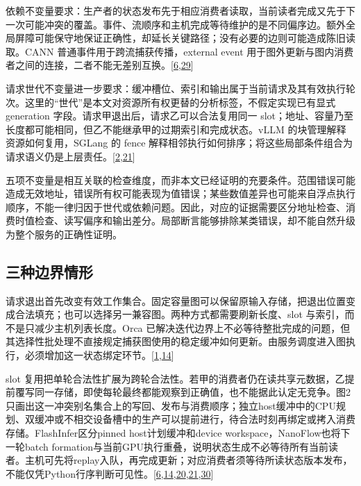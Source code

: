 \documentclass[
  UTF8,
  zihao=5]{ctexart}
\begin{document}
依赖不变量要求：生产者的状态发布先于相应消费者读取，当前读者完成又先于下一次可能冲突的覆盖。事件、流顺序和主机完成等待维护的是不同偏序边。额外全局屏障可能保守地保证正确性，却延长关键路径；没有必要的边则可能造成陈旧读取。CANN
普通事件用于跨流捕获传播，external event
用于图外更新与图内消费者之间的连接，二者不能无差别互换。{[}\protect\hyperlink{ref-cann910update}{6},\protect\hyperlink{ref-cann910multi}{29}{]}

请求世代不变量进一步要求：缓冲槽位、索引和输出属于当前请求及其有效执行轮次。这里的``世代''是本文对资源所有权更替的分析标签，不假定实现已有显式
generation 字段。请求甲退出后，请求乙可以合法复用同一
slot；地址、容量乃至长度都可能相同，但乙不能继承甲的过期索引和完成状态。vLLM
的块管理解释资源如何复用，SGLang 的 fence
解释相邻执行如何排序；将这些局部条件组合为请求语义仍是上层责任。{[}\protect\hyperlink{ref-kwon2023vllm}{2},\protect\hyperlink{ref-sglang2026impl}{21}{]}

五项不变量是相互关联的检查维度，而非本文已经证明的充要条件。范围错误可能造成无效地址，错误所有权可能表现为值错误；某些数值差异也可能来自浮点执行顺序，不能一律归因于世代或依赖问题。因此，对应的证据需要区分地址检查、消费时值检查、读写偏序和输出差分。局部断言能够排除某类错误，却不能自然升级为整个服务的正确性证明。

\hypertarget{ux4e09ux79cdux8fb9ux754cux60c5ux5f62}{%
\subsection{三种边界情形}\label{ux4e09ux79cdux8fb9ux754cux60c5ux5f62}}

请求退出首先改变有效工作集合。固定容量图可以保留原输入存储，把退出位置变成合法填充；也可以选择另一兼容图。两种方式都需要刷新长度、slot
与索引，而不是只减少主机列表长度。Orca
已解决迭代边界上不必等待整批完成的问题，但其选择性批处理不直接规定捕获图使用的稳定缓冲如何更新。由服务调度进入图执行，必须增加这一状态绑定环节。{[}\protect\hyperlink{ref-yu2022orca}{1},\protect\hyperlink{ref-ye2025flashinfer}{14}{]}

slot
复用把单轮合法性扩展为跨轮合法性。若甲的消费者仍在读共享元数据，乙提前覆写同一存储，即使每轮最终都能观察到正确值，也不能据此认定无竞争。图2只画出这一冲突别名集合上的写回、发布与消费顺序；独立host缓冲中的CPU规划、双缓冲或不相交设备槽中的生产可以提前进行，待合法时刻再绑定或拷入消费存储。FlashInfer区分pinned
host计划缓冲和device workspace，NanoFlow也将下一轮batch
formation与当前GPU执行重叠，说明状态生成不必等待所有当前读者。主机可先将replay入队，再完成更新；对应消费者须等待所读状态版本发布，不能仅凭Python行序判断可见性。{[}\protect\hyperlink{ref-cann910update}{6},\protect\hyperlink{ref-ye2025flashinfer}{14},\protect\hyperlink{ref-vllmascend2026impl}{20},\protect\hyperlink{ref-sglang2026impl}{21},\protect\hyperlink{ref-zhu2025nanoflow}{30}{]}
\end{document}
